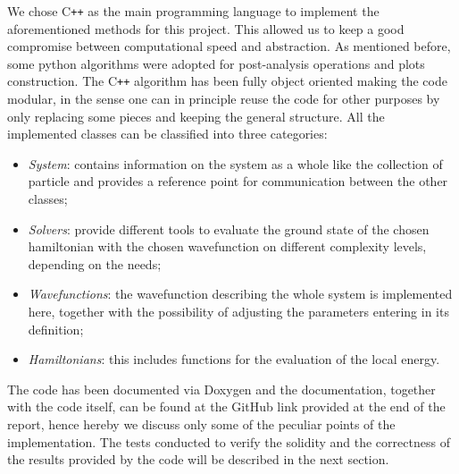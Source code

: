 We chose C\texttt{++} as the main programming language to implement the aforementioned methods for this project. This allowed us to keep a good compromise between computational speed and abstraction. As mentioned before, some python algorithms were adopted for post-analysis operations and plots construction. The C\texttt{++} algorithm has been fully object oriented making the code modular, in the sense one can in principle reuse the code for other purposes by only replacing some pieces and keeping the general structure. All the implemented classes can be classified into three categories:
\begin{itemize}
    \item \emph{System}: contains information on the system as a whole like the collection of particle and provides a reference point for communication between the other classes;
    \item \emph{Solvers}: provide different tools to evaluate the ground state of the chosen hamiltonian with the chosen wavefunction on different complexity levels, depending on the needs;
    \item \emph{Wavefunctions}: the wavefunction describing the whole system is implemented here, together with the possibility of adjusting the parameters entering in its definition;
    \item \emph{Hamiltonians}: this includes functions for the evaluation of the local energy.
\end{itemize}
The code has been documented via Doxygen and the documentation, together with the code itself, can be found at the GitHub link provided at the end of the report, hence hereby we discuss only some of the peculiar points of the implementation. The tests conducted to verify the solidity and the correctness of the results provided by the code will be described in the next section.

